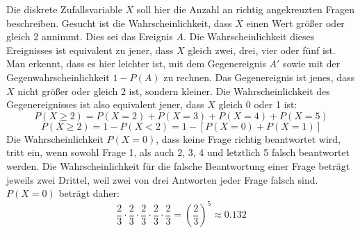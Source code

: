 Die diskrete Zufallsvariable $X$ soll hier die Anzahl an richtig angekreuzten Fragen beschreiben. Gesucht ist die Wahrscheinlichkeit, dass $X$ einen Wert gr\"{o}\ss{}er oder gleich 2 annimmt. Dies sei das Ereignis $A$. Die Wahrscheinlichkeit dieses Ereignisses ist equivalent zu jener, dass $X$ gleich zwei, drei, vier oder f\"{u}nf ist. Man erkennt, dass es hier leichter ist, mit dem Gegenereignis $A'$ sowie mit der Gegenwahrscheinlichkeit $1 - P(A)$ zu rechnen. Das Gegenereignis ist jenes, dass $X$ nicht gr\"{o}\ss{}er oder gleich 2 ist, sondern kleiner. Die Wahrscheinlichkeit des Gegenereignisses ist also equivalent jener, dass $X$ gleich 0 oder 1 ist: $$P(X \geq 2) = P(X=2) + P(X=3) + P(X=4) + P(X=5)$$ $$P(X \geq 2) = 1 - P(X < 2) = 1 - [P(X=0) + P(X=1)]$$ Die Wahrscheinlichkeit $P(X = 0)$, dass keine Frage richtig beantwortet wird, tritt ein, wenn sowohl Frage 1, als auch 2, 3, 4 und letztlich 5 falsch beantwortet werden. Die Wahrscheinlichkeit f\"{u}r die falsche Beantwortung einer Frage betr\"{a}gt jeweils zwei Drittel, weil zwei von drei Antworten jeder Frage falsch sind. $P(X = 0)$ betr\"{a}gt daher: $$\frac{2}{3} \cdot \frac{2}{3} \cdot \frac{2}{3} \cdot \frac{2}{3} \cdot \frac{2}{3} = \left(\frac{2}{3}\right)^5 \approx 0.132$$

